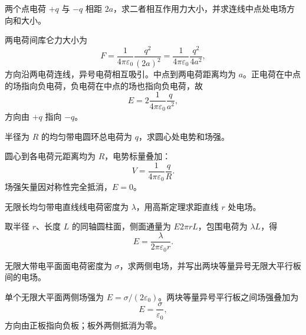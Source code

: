 %
%

\begin{exercise}[level=basic]
两个点电荷 $+q$ 与 $-q$ 相距 $2a$，求二者相互作用力大小，并求连线中点处电场方向和大小。
\begin{solution}
两电荷间库仑力大小为
\[
  F=\frac{1}{4\pi\varepsilon_0}\frac{q^2}{(2a)^2}
  =\frac{1}{4\pi\varepsilon_0}\frac{q^2}{4a^2},
\]
方向沿两电荷连线，异号电荷相互吸引。中点到两电荷距离均为 $a$。正电荷在中点的场指向负电荷，负电荷在中点的场也指向负电荷，故
\[
  E=2\frac{1}{4\pi\varepsilon_0}\frac{q}{a^2},
\]
方向由 $+q$ 指向 $-q$。
\end{solution}
\end{exercise}

\begin{exercise}[level=basic]
半径为 $R$ 的均匀带电圆环总电荷为 $q$，求圆心处电势和场强。
\begin{solution}
圆心到各电荷元距离均为 $R$，电势标量叠加：
\[
  V=\frac{1}{4\pi\varepsilon_0}\frac{q}{R}.
\]
场强矢量因对称性完全抵消，$E=0$。
\end{solution}
\end{exercise}

\begin{exercise}[level=basic]
无限长均匀带电直线线电荷密度为 $\lambda$，用高斯定理求距直线 $r$ 处电场。
\begin{solution}
取半径 $r$、长度 $L$ 的同轴圆柱面，侧面通量为 $E2\pi rL$，包围电荷为 $\lambda L$，得
\[
  E=\frac{\lambda}{2\pi\varepsilon_0r}.
\]
\end{solution}
\end{exercise}

\begin{exercise}[level=basic]
无限大带电平面面电荷密度为 $\sigma$，求两侧电场，并写出两块等量异号无限大平行板间的电场。
\begin{solution}
单个无限大平面两侧场强为 $E=\sigma/(2\varepsilon_0)$。两块等量异号平行板之间场强叠加为
\[
  E=\frac{\sigma}{\varepsilon_0},
\]
方向由正板指向负板；板外两侧抵消为零。
\end{solution}
\end{exercise}

